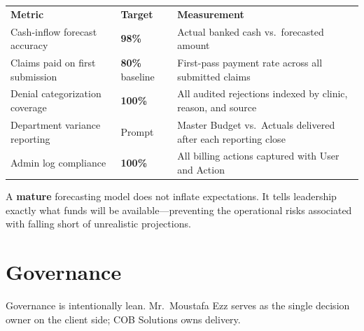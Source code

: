\documentclass[11pt,a4paper]{article}
\begin{document}
\begin{center}
\begin{tabularx}{\linewidth}{L{5.5cm} C{2.5cm} X}
  \color{white}\textbf{Metric} & \color{white}\textbf{Target} & \color{white}\textbf{Measurement} \\
  Cash-inflow forecast accuracy &
    \textbf{98\%} &
    Actual banked cash vs.\ forecasted amount \\
  Claims paid on first submission &
    \textbf{80\%} baseline &
    First-pass payment rate across all submitted claims \\
  Denial categorization coverage &
    \textbf{100\%} &
    All audited rejections indexed by clinic, reason, and source \\
  Department variance reporting &
    Prompt &
    Master Budget vs.\ Actuals delivered after each reporting close \\
  Admin log compliance &
    \textbf{100\%} &
    All billing actions captured with User and Action \\
\end{tabularx}
\end{center}

\begin{tcolorbox}[successbox,title={Maturity Definition}]
A \textbf{mature} forecasting model does not inflate expectations. It tells leadership
exactly what funds will be available---preventing the operational risks
associated with falling short of unrealistic projections.
\end{tcolorbox}


\section{Governance}

Governance is intentionally lean. Mr.\ Moustafa Ezz serves as the single decision owner
on the client side; COB Solutions owns delivery.
\end{document}
